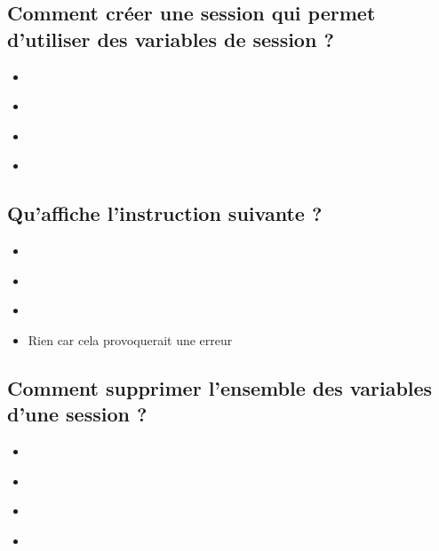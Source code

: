 \documentclass[11pt,a4paper]{article}
\begin{document}
\subsection{Comment créer une session qui permet d'utiliser des variables de session ?}

\begin{itemize}
\item[\CaseCoche]  \\
\item[\CaseCoche]  \\
\item[\CaseCoche]  \\
\item[\CaseCoche]  \\
\end{itemize}


\subsection{Qu'affiche l'instruction suivante ?}


\bigskip

\begin{itemize}
\item[\CaseCoche]  \\
\item[\CaseCoche]  \\
\item[\CaseCoche]  \\
\item[\CaseCoche] Rien car cela provoquerait une erreur \\
\end{itemize}


\newpage


\subsection{Comment supprimer l'ensemble des variables d'une session ?}

\begin{itemize}
\item[\CaseCoche]  \\
\item[\CaseCoche]  \\
\item[\CaseCoche]  \\
\item[\CaseCoche]  \\
\end{itemize}
\end{document}
